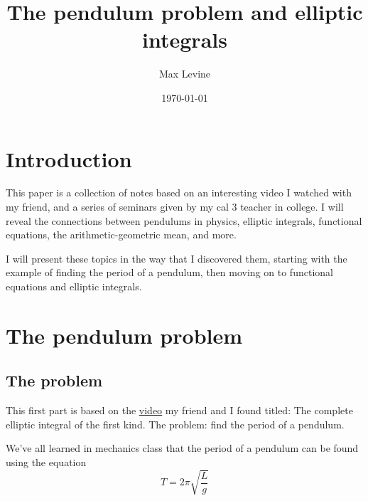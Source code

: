 \documentclass[11pt]{article}
\title{The pendulum problem and elliptic integrals}
\author{Max Levine}
\date{\today}
\begin{document}
\maketitle
\tableofcontents

\section{Introduction}
This paper is a collection of notes based on an interesting video I watched with my friend, and a series of seminars given by my cal 3 teacher in college. I will reveal the connections between pendulums in physics, elliptic integrals, functional equations, the arithmetic-geometric mean, and more.

\vspace{5mm} I will present these topics in the way that I discovered them, starting with the example of finding the period of a pendulum, then moving on to functional equations and elliptic integrals. 

\section{The pendulum problem}
\subsection{The problem}
This first part is based on the \underline{\href{https://www.youtube.com/watch?v=h19xcTPzlEc}{video}} my friend and I found titled: The complete elliptic integral of the first kind.
The problem: find the period of a pendulum.

\vspace{10mm}\begin{minipage}{6cm}
We've all learned in mechanics class that the period of a pendulum can be found using the equation
$$T=2\pi\sqrt{\dfrac{L}{g}}$$
\end{minipage} \quad
{}
\end{document}
